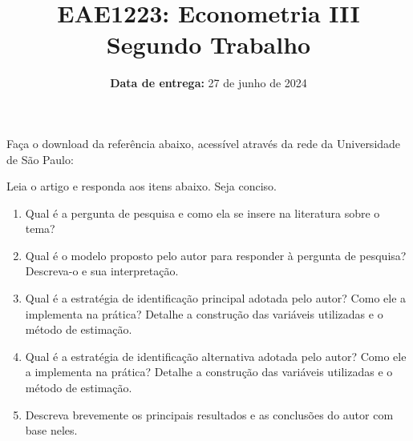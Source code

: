 \documentclass[12pt,a4paper]{article}
\title{ \large EAE1223: Econometria III \\
	{\large Segundo Trabalho}}
\date{\small \textbf{Data de entrega:} 27 de junho de 2024}
\begin{document}
	\maketitle
Faça o download da referência abaixo, acessível através da rede da Universidade de São Paulo:

\vspace{1em}
\noindent{}
\vspace{1em}

Leia o artigo e responda aos itens abaixo. Seja conciso.

\begin{enumerate}
	\item Qual é a pergunta de pesquisa e como ela se insere na literatura sobre o tema?
	\item Qual é o modelo proposto pelo autor para responder à pergunta de pesquisa? Descreva-o e sua interpretação.
	
	\item Qual é a estratégia de identificação principal adotada pelo autor? Como ele a implementa na prática? Detalhe a construção das variáveis utilizadas e o método de estimação.
	
	\item  Qual é a estratégia de identificação alternativa adotada pelo autor? Como ele a implementa na prática? Detalhe a construção das variáveis utilizadas e o método de estimação.
	
	\item Descreva brevemente os principais resultados e as conclusões do autor com base neles.
\end{enumerate} 
\end{document}
